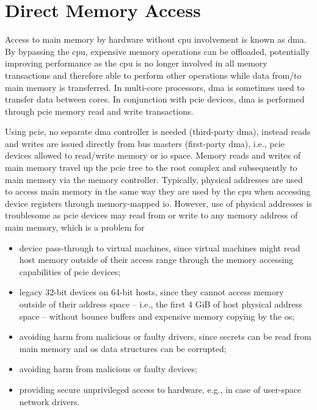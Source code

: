 \section{Direct Memory Access}
\label{sec:dma}

Access to main memory by hardware without \ac{cpu} involvement is known as
\acf{dma}. By bypassing the \ac{cpu}, expensive memory operations can be
offloaded, potentially improving performance as the \ac{cpu} is no longer
involved in all memory transactions and therefore able to perform other
operations while data from/to main memory is transferred. In multi-core
processors, \ac{dma} is sometimes used to transfer data between cores. In
conjunction with \ac{pcie} devices, \ac{dma} is performed through \ac{pcie}
memory read and write transactions.

Using \ac{pcie}, no separate \ac{dma} controller is needed (third-party
\ac{dma}), instead reads and writes are issued directly from bus masters
(first-party \ac{dma}), i.e., \ac{pcie} devices allowed to read/write memory or
\ac{io} space. Memory reads and writes of main memory travel up the \ac{pcie}
tree to the root complex and subsequently to main memory via the memory
controller. Typically, physical addresses are used to access main memory in the
same way they are used by the \ac{cpu} when accessing device registers through
memory-mapped \ac{io}. However, use of physical addresses is troublesome as
\ac{pcie} devices may read from or write to any memory address of main memory,
which is a problem for

\begin{itemize}
    \item device pass-through to virtual machines, since virtual machines might
        read host memory outside of their access range through the memory
        accessing capabilities of \ac{pcie} devices;
    \item legacy 32-bit devices on 64-bit hosts, since they cannot access memory
        outside of their address space -- i.e., the first 4 GiB of host physical
        address space -- without bounce buffers and expensive memory copying by
        the \ac{os};
    \item avoiding harm from malicious or faulty drivers, since secrets can be
        read from main memory and \ac{os} data structures can be corrupted;
    \item avoiding harm from malicious or faulty devices;
    \item providing secure unprivileged access to hardware, e.g., in case of
        user-space network drivers.
\end{itemize}

